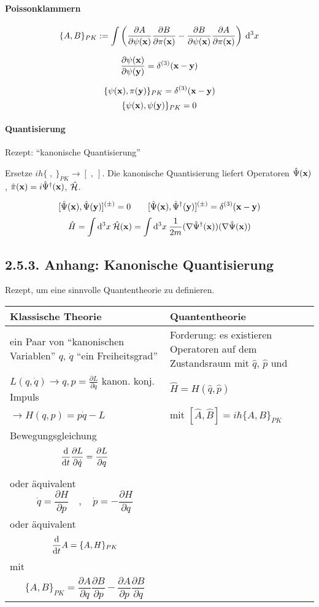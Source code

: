 \documentclass[11pt,a4paper]{report}
\begin{document}
\paragraph{Poissonklammern}
$$\{A,B\}_{PK}:=\int\left(\frac{\partial A}{\partial\psi (\mathbf{x})}\frac{\partial B}{\partial\pi (\mathbf{x})}-\frac{\partial B}{\partial\psi (\mathbf{x})}\frac{\partial A}{\partial\pi (\mathbf{x})}\right)\:\mathrm{d}^3x$$

$$\frac{\partial\psi (\mathbf{x})}{\partial\psi (\mathbf{y})}=\delta^{(3)}(\mathbf{x}-\mathbf{y})$$

$$\{\psi (\mathbf{x}),\pi (\mathbf{y})\}_{PK} = \delta^{(3)}(\mathbf{x}-\mathbf{y})$$
$$\{\psi (\mathbf{x}),\psi (\mathbf{y})\}_{PK}=0$$

\paragraph{Quantisierung} Rezept: ``kanonische Quantisierung''

Ersetze $ih\{\; ,\:\}_{PK}\longrightarrow [\; ,\:]$. Die kanonische Quantisierung liefert Operatoren $\hat{\Psi} (\mathbf{x})$, $\hat{\pi}(\mathbf{x})=i\hat{\Psi}^\dagger (\mathbf{x})$, $\hat{\mathcal{H}}$.

$$[\hat{\Psi} (\mathbf{x}),\hat{\Psi} (\mathbf{y})]^{(\pm )}=0\qquad [\hat{\Psi} (\mathbf{x}),\hat{\Psi}^\dagger (\mathbf{y})]^{(\pm )}=\delta^{(3)}(\mathbf{x}-\mathbf{y})$$
$$\hat{H}=\int\mathrm{d}^3x\:\hat{\mathcal{H}}(\mathbf{x}) = \int\mathrm{d}^3x\:\frac{1}{2m}(\nabla\hat{\Psi}^\dagger (\mathbf{x}))(\nabla\hat{\Psi} (\mathbf{x}))$$

\subsection*{2.5.3. Anhang: Kanonische Quantisierung}

Rezept, um eine sinnvolle Quantentheorie zu definieren.\par 

\begin{tabular}{|p{8cm}|p{8cm}|}
\hline 
Klassische Theorie & Quantentheorie \\
\hline 
ein Paar von ``kanonischen Variablen'' $q$, $\dot{q}$ ``ein Freiheitsgrad'' & Forderung: es existieren Operatoren auf dem Zustandsraum mit $\hat{q}$, $\hat{p}$ und \\
$L(q,\dot{q})\rightarrow q, p=\frac{\partial L}{\partial\dot{q}}$ kanon. konj. Impuls & $\hat{H}=H(\hat{q},\hat{p})$\\
$\rightarrow H(q,p)=p\dot{q}-L$ &  mit $[\hat{A},\hat{B}]=i\hbar \{ A,B\}_{PK}$\\
Bewegungsgleichung $$\frac{\mathrm{d}}{\mathrm{d} t}\frac{\partial L}{\partial\dot{q}}=\frac{\partial L}{\partial q}$$ & \\
oder äquivalent $$\dot{q}=\frac{\partial H}{\partial p}\quad ,\quad \dot{p}=-\frac{\partial H}{\partial q}$$ & \\
oder äquivalent $$\frac{\mathrm{d}}{\mathrm{d} t}A = \{ A,H\}_{PK}$$ mit & \\
$$\{A ,B\}_{PK} = \frac{\partial A}{\partial q}\frac{\partial B}{\partial p} - \frac{\partial A}{\partial p}\frac{\partial B}{\partial q}$$ & \\
\hline
\end{tabular}
\end{document}
